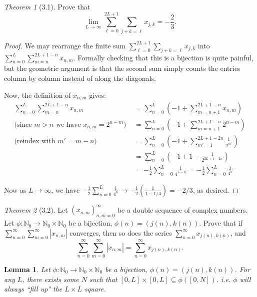 \documentclass[12pt]{article}
\newtheorem{lemma}{Lemma}
\theoremstyle{remark}
\theoremstyle{named}
\newtheorem*{theorem}{Theorem}
\begin{document}
\begin{theorem}[3.1]
    Prove that
    \[\lim_{L \to \infty} \sum_{\ell = 0}^{2L + 1} \sum_{j + k = \ell} x_{j, k} = -\frac{2}{3}.\]
\end{theorem}

\begin{proof}
    We may rearrange the finite sum \(\sum_{\ell = 0}^{2L + 1} \sum_{j + k = \ell} x_{j, k}\) into \(\sum_{n = 0}^L \sum_{m = n}^{2L + 1 - n} x_{n, m}\). Formally checking that this is a bijection is quite painful, but the geometric argument is that the second sum simply counts the entries column by column instead of along the diagonals.

    Now, the definition of \(x_{n, m}\) gives:
    \begin{align*}
        \sum_{n = 0}^L \sum_{m = n}^{2L + 1 - n} x_{n, m} &= \sum_{n = 0}^L \left(-1 + \sum_{m = n + 1}^{2L + 1 - n} x_{n, m}\right) \\ 
        \text{(since \(m > n\) we have \(x_{n, m} = 2^{n - m}\))  } &= \sum_{n = 0}^L \left(-1 + \sum_{m = n + 1}^{2L + 1 - n} 2^{n - m}\right) \\
        \text{(reindex with \(m' = m - n\))   } &= \sum_{n = 0}^L \left(-1 + \sum_{m' = 1}^{2L + 1 - 2n} \frac{1}{2^{m'}}\right) \\
        &= \sum_{n = 0}^L \left(-1 + 1 - \frac{1}{2^{2L + 1 - 2n}}\right) \\
        &= -\frac{1}{2} \sum_{n = 0}^L \frac{1}{4^{L - n}} = -\frac{1}{2} \sum_{n = 0}^L \frac{1}{4^{n}}
    \end{align*}

    Now as \(L \to \infty\), we have \(-\frac{1}{2} \sum_{n = 0}^L \frac{1}{4^{n}} \to -\frac{1}{2} \left(\frac{1}{1 - 1/4}\right) = -2/3\), as desired.
\end{proof}

\begin{theorem}[3.2]
    Let \((x_{n, m})_{n, m = 0}^\infty\) be a double sequence of complex numbers. Let \(\phi : \mathbb{N}_0 \to \mathbb{N}_0 \times \mathbb{N}_0\) be a bijection, \(\phi(n) = (j(n), k(n))\). Prove that if \(\sum_{n = 0}^\infty \sum_{m = 0}^\infty |x_{n, m}|\) converges, then so does the series \(\sum_{n = 0}^\infty x_{j(n), k(n)}\), and
    \[\sum_{n = 0}^\infty \sum_{m = 0}^\infty |x_{n, m}| = \sum_{n = 0}^\infty x_{j(n), k(n)}.\]
\end{theorem}

\begin{lemma}
    Let \(\phi : \mathbb{N}_0 \to \mathbb{N}_0 \times \mathbb{N}_0\) be a bijection, \(\phi(n) = (j(n), k(n))\). For any \(L\), there exists some \(N\) such that \([0, L] \times [0, L] \subseteq \phi([0, N])\). i.e. \(\phi\) will always ``fill up" the \(L \times L\) square.
\end{lemma}
\end{document}
